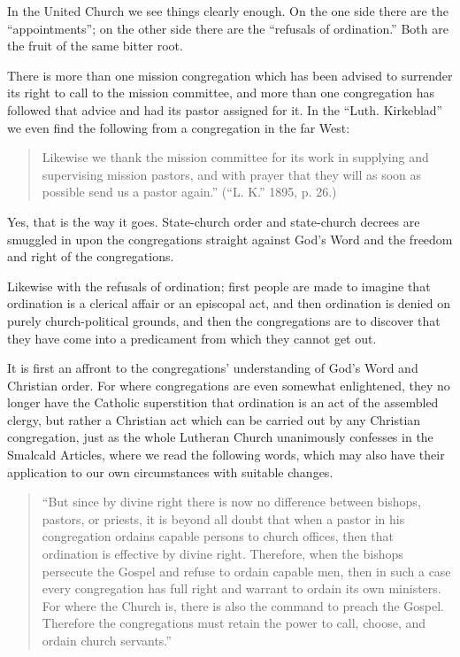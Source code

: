 In the United Church we see things clearly enough. On the one side there are the “appointments”; on the other side there are the “refusals of ordination.” Both are the fruit of the same bitter root.

There is more than one mission congregation which has been advised to surrender its right to call to the mission committee, and more than one congregation has followed that advice and had its pastor assigned for it. In the “Luth. Kirkeblad” we even find the following from a congregation in the far West:

\begin{quote}
Likewise we thank the mission committee for its work in supplying and supervising mission pastors, and with prayer that they will as soon as possible send us a pastor again.” (“L. K.” 1895, p. 26.)
\end{quote}

Yes, that is the way it goes. State-church order and state-church decrees are smuggled in upon the congregations straight against God’s Word and the freedom and right of the congregations.

Likewise with the refusals of ordination; first people are made to imagine that ordination is a clerical affair or an episcopal act, and then ordination is denied on purely church-political grounds, and then the congregations are to discover that they have come into a predicament from which they cannot get out.

It is first an affront to the congregations’ understanding of God’s Word and Christian order. For where congregations are even somewhat enlightened, they no longer have the Catholic superstition that ordination is an act of the assembled clergy, but rather a Christian act which can be carried out by any Christian congregation, just as the whole Lutheran Church unanimously confesses in the Smalcald Articles, where we read the following words, which may also have their application to our own circumstances with suitable changes.

\begin{quote}
“But since by divine right there is now no difference between bishops, pastors, or priests, it is beyond all doubt that when a pastor in his congregation ordains capable persons to church offices, then that ordination is effective by divine right. Therefore, when the bishops persecute the Gospel and refuse to ordain capable men, then in such a case every congregation has full right and warrant to ordain its own ministers. For where the Church is, there is also the command to preach the Gospel. Therefore the congregations must retain the power to call, choose, and ordain church servants.”
\end{quote}

